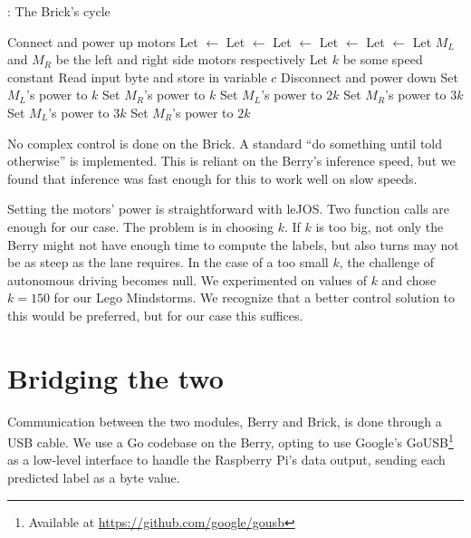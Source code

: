 \begin{algorithm}[H]
  \caption{: The Brick's cycle}
  \begin{algorithmic}[1]
    \State Connect and power up motors
    \State Let  $\gets$ 
    \State Let  $\gets$ 
    \State Let  $\gets$ 
    \State Let  $\gets$ 
    \State Let  $\gets$ 
    \State Let $M_L$ and $M_R$ be the left and right side motors respectively
    \State Let $k$ be some speed constant
        \State Read input byte and store in variable $c$
          \State Disconnect and power down
          \State Set $M_L$'s power to $k$
          \State Set $M_R$'s power to $k$
          \State Set $M_L$'s power to $2k$
          \State Set $M_R$'s power to $3k$
          \State Set $M_L$'s power to $3k$
          \State Set $M_R$'s power to $2k$
        \EndIf%
      \EndIf%
    \EndWhile%
  \end{algorithmic}
\end{algorithm}

No complex control is done on the Brick. A standard ``do something until told otherwise'' is
implemented. This is reliant on the Berry's inference speed, but we found that inference was fast
enough for this to work well on slow speeds.

Setting the motors' power is straightforward with leJOS. Two function calls are enough for our
case. The problem is in choosing $k$. If $k$ is too big, not only the Berry might not have enough
time to compute the labels, but also turns may not be as steep as the lane requires. In the case of
a too small $k$, the challenge of autonomous driving becomes null. We experimented on values of $k$
and chose $k=150$ for our Lego Mindstorms. We recognize that a better control solution to this
would be preferred, but for our case this suffices.

\section{Bridging the two}

Communication between the two modules, Berry and Brick, is done through a USB cable. We use a Go
codebase on the Berry, opting to use Google's GoUSB\footnote{Available at
\url{https://github.com/google/gousb}} as a low-level interface to handle the Raspberry Pi's data
output, sending each predicted label as a byte value.

